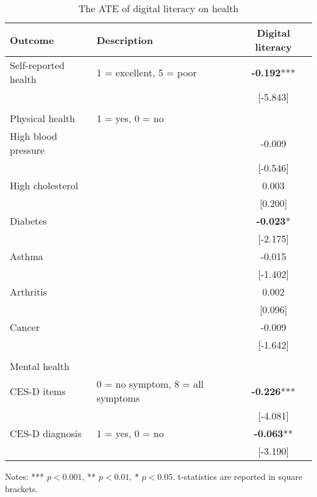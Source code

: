 \documentclass[11pt]{article}
\begin{document}
    \begin{table}[h!]
        \centering
        \caption{The ATE of digital literacy on health}
        \label{tab:iptw}
        \begin{threeparttable}
            \begin{tabular}{llc}
                \toprule
                Outcome & Description & Digital literacy \\
                \midrule
                Self-reported health & 1 = excellent, 5 = poor & \textbf{-0.192}*** \\
                & & [-5.843] \\
                & & \\
                Physical health & 1 = yes, 0 = no & \\
                High blood pressure &  & -0.009 \\
                &  & [-0.546] \\
                High cholesterol &  & 0.003 \\
                &  & [0.200] \\
                Diabetes &  & \textbf{-0.023}* \\
                &  & [-2.175] \\
                Asthma &  & -0.015 \\
                &  & [-1.402] \\
                Arthritis &  & 0.002 \\
                &  & [0.096] \\
                Cancer &  & -0.009 \\
                &  & [-1.642] \\
                & & \\
                Mental health & & \\
                CES-D items & 0 = no symptom, 8 = all symptoms & \textbf{-0.226}*** \\
                & & [-4.081] \\
                CES-D diagnosis & 1 = yes, 0 = no & \textbf{-0.063}** \\
                & & [-3.190] \\
                \bottomrule
            \end{tabular}
            \begin{tablenotes}
                \footnotesize
                \item Notes: *** $p < 0.001$, ** $p < 0.01$, * $p < 0.05$. t-statistics are reported in square brackets.
            \end{tablenotes}
        \end{threeparttable}
    \end{table}
\end{document}
